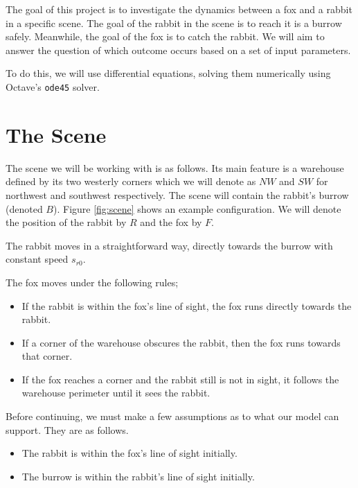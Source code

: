 The goal of this project is to investigate the dynamics between a fox and a rabbit in a specific scene. The goal of the rabbit in the scene is to reach it is a burrow safely. Meanwhile, the goal of the fox is to catch the rabbit. We will aim to answer the question of which outcome occurs based on a set of input parameters.

To do this, we will use differential equations, solving them numerically using Octave's \texttt{ode45} solver.

\section{The Scene}

The scene we will be working with is as follows. Its main feature is a warehouse defined by its two westerly corners which we will denote as $NW$ and $SW$ for northwest and southwest respectively. The scene will contain the rabbit's burrow (denoted $B$). Figure \ref{fig:scene} shows an example configuration. We will denote the position of the rabbit by $R$ and the fox by $F$.

The rabbit moves in a straightforward way, directly towards the burrow with constant speed $s_{r0}$.

The fox moves under the following rules;

\begin{itemize}

\item If the rabbit is within the fox's line of sight, the fox runs directly towards the rabbit.

\item If a corner of the warehouse obscures the rabbit, then the fox runs towards that corner.

\item If the fox reaches a corner and the rabbit still is not in sight, it follows the warehouse perimeter until it sees the rabbit.
\end{itemize}

Before continuing, we must make a few assumptions as to what our model can support. They are as follows.

\begin{itemize}

\item The rabbit is within the fox's line of sight initially.
\item The burrow is within the rabbit's line of sight initially.

\end{itemize}

